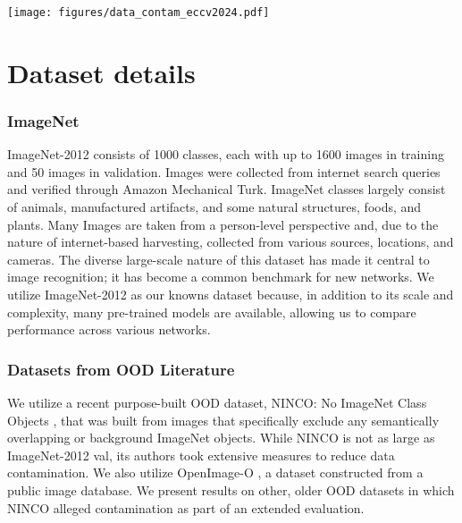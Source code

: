 
\begin{figure*}[t]
  \centering 
  \texttt{[image: figures/data\_contam\_eccv2024.pdf]}
\end{figure*}

\section{Dataset details}

\subsubsection{ImageNet}
ImageNet-2012 \cite{ILSVRC15} consists of 1000 classes, each with up to 1600 images in training and 50 images in validation.
Images were collected from internet search queries and verified through Amazon Mechanical Turk. 
ImageNet classes largely consist of animals, manufactured artifacts, and some natural structures, foods, and plants. 
Many Images are taken from a person-level perspective and, due to the nature of internet-based harvesting, collected from various sources, locations, and cameras. 
The diverse large-scale nature of this dataset has made it central to image recognition; it has become a common benchmark for new networks. 
We utilize ImageNet-2012 as our knowns dataset because, in addition to its scale and complexity, many pre-trained models are available, allowing us to compare performance across various networks.

\subsubsection{Datasets from OOD Literature}
We utilize a recent purpose-built OOD dataset, NINCO: No ImageNet Class Objects \cite{bitterwolf2023or}, that was built from images that specifically exclude any semantically overlapping or background ImageNet objects.
While NINCO is not as large as ImageNet-2012 val, its authors took extensive measures to reduce data contamination.
We also utilize OpenImage-O \cite{wang2022vim}, a dataset constructed from a public image database.
We present results on other, older OOD datasets in which NINCO alleged contamination as part of an extended evaluation.

